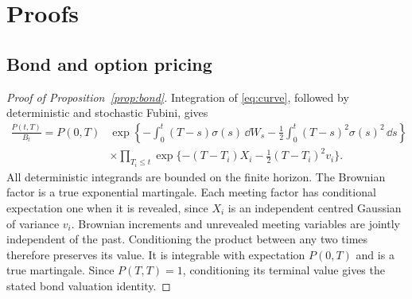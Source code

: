 \section{Proofs}
\subsection{Bond and option pricing}\label{app:pricing}
\begin{proof}[Proof of Proposition~\ref{prop:bond}]
Integration of \eqref{eq:curve}, followed by deterministic and stochastic Fubini, gives
\begin{align}\label{eq:discountbond}
\frac{P(t,T)}{B_t}=P(0,T)&\exp\left\{-\int_0^t(T-s)\sigma(s)\,\dd W_s
                        -\frac12\int_0^t(T-s)^2\sigma(s)^2\,\dd s\right\}\nonumber\\
&\times\prod_{T_i\leq t}\exp\{- (T-T_i)X_i-\tfrac12(T-T_i)^2v_i\}.
\end{align}
All deterministic integrands are bounded on the finite horizon. The Brownian factor is a true exponential martingale. Each meeting factor has conditional expectation one when it is revealed, since $X_i$ is an independent centred Gaussian of variance $v_i$. Brownian increments and unrevealed meeting variables are jointly independent of the past. Conditioning the product between any two times therefore preserves its value. It is integrable with expectation $P(0,T)$ and is a true martingale. Since $P(T,T)=1$, conditioning its terminal value gives the stated bond valuation identity.
\end{proof}

